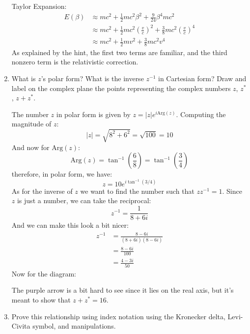 \documentclass[10pt]{article}
\begin{document}
\begin{enumerate}[label=\alph*)]
\begin{solution}
				Taylor Expansion:
				\begin{align*}
					E(\beta) &\approx mc^2 + \frac{1}{2}mc^2 \beta^2  + \frac{9}{24}\beta^4 mc^2\\
							 &\approx mc^2 + \frac{1}{2}mc^2\left(\frac{v}{c}\right)^2 + 
							 \frac{3}{8}mc^2\left(\frac{v}{c}\right)^4\\
							 &\approx mc^2 + \frac{1}{2}mv^2 + \frac{3}{8}mc^2 v^4
				\end{align*}
				As explained by the hint, the first two terms are familiar, and the third nonzero term is the 
				relativistic correction. 
			\end{solution}
		\item What is $z$'s polar form? What is the inverse $z^{-1}$ in Cartesian form? Draw and label 
			on the complex plane the points representing the complex numbers $z$, $z^*$, $z + z^*$.

			\begin{solution}
				The number $z$ in polar form is given by $z = |z|e^{i \mathrm{Arg}(z)}$. Computing the magnitude
				of $z$:
				\[
				|z| = \sqrt{8^2 + 6^2} = \sqrt{100}  = 10
				\] 
				And now for $\mathrm{Arg}(z)$:
				\[
					\mathrm{Arg}(z) = \tan^{-1}\left(\frac{6}{8}\right) = \tan^{-1}\left(\frac{3}{4}\right)
				\] 
				therefore, in polar form, we have:
				\[
					z = 10e^{i \tan^{-1}(3 / 4)}
				\] 
				As for the inverse of $z$ we want to find the number such that $z z^{-1} = 1$. Since $z$ 
				is just a number, we can take the reciprocal:
				\[
					z^{-1} = \frac{1}{8 + 6i}
				\] 
				And we can make this look a bit nicer:
				\begin{align*}
					z^{-1} &= \frac{8 - 6i}{(8 + 6i)(8 - 6i)} \\
					&= \frac{8 - 6i}{100} \\
					&= \frac{4 - 3i}{50}
				\end{align*}
				Now for the diagram:
				\begin{center}
				\end{center}
				The purple arrow is a bit hard to see since it lies on the real axis, but it's meant to show 
				that $z + z^* = 16$. 
			\end{solution}
		\item Prove this relationship using index notation using the Kronecker delta, Levi-Civita symbol, and 
			manipulations.


\end{enumerate}
\end{document}
